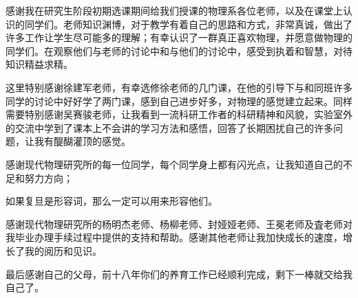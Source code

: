 \documentclass[a4paper, 12pt]{book}
\begin{document}
感谢我在研究生阶段初期选课期间给我们授课的物理系各位老师，以及在课堂上认识的同学们。老师知识渊博，对于教学有着自己的思路和方式，非常真诚，做出了许多工作让学生尽可能多的理解；有幸认识了一群真正喜欢物理，并愿意做物理的同学们。在观察他们与老师的讨论中和与他们的讨论中，感受到执着和智慧，对待知识精益求精。

这里特别感谢徐建军老师，有幸选修徐老师的几门课，在他的引导下与和同班许多同学的讨论中好好学了两门课，感到自己进步好多，对物理的感觉建立起来。同样需要特别感谢吴赛骏老师，让我看到一流科研工作者的科研精神和风貌，实验室外的交流中学到了课本上不会讲的学习方法和感悟，回答了长期困扰自己的许多问题，让我有醍醐灌顶的感觉。

感谢现代物理研究所的每一位同学，每个同学身上都有闪光点，让我知道自己的不足和努力方向；

如果复旦是形容词，那么一定可以用来形容他们。

感谢现代物理研究所的杨明杰老师、杨柳老师、封娅娅老师、王冕老师及査老师对我毕业办理手续过程中提供的支持和帮助。感谢其他老师让我加快成长的速度，增长了我的阅历和见识。

最后感谢自己的父母，前十八年你们的养育工作已经顺利完成，剩下一棒就交给我自己了。

\clearpage
\printindex
\end{document}
